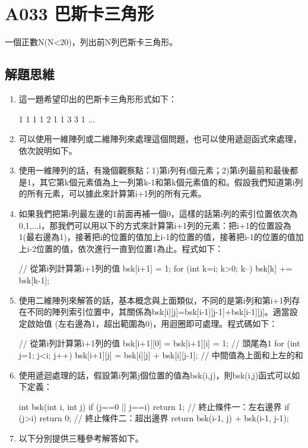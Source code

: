 \section{A033 巴斯卡三角形}
一個正數N(N<20)，列出前N列巴斯卡三角形。

\subsection{解題思維}

\begin{enumerate}
	\item 這一題希望印出的巴斯卡三角形形式如下：
	\begin{inside}
	1
	1 1
	1 2 1
	1 3 3 1
	...
	\end{inside}
	\item 可以使用一維陣列或二維陣列來處理這個問題，也可以使用遞迴函式來處理，依次說明如下。
	\item 使用一維陣列的話，有幾個觀察點：1)第i列有i個元素；2)第i列最前和最後都是1，其它第k個元素值為上一列第k-1和第k個元素值的和。假設我們知道第i列的所有元素，可以據此來計算第i+1列的所有元素。
	\item 如果我們把第i列最左邊的1前面再補一個0，這樣的話第i列的索引位置依次為0,1,...i，那我們可以用以下的方式來計算第i+1列的元素：把i+1的位置設為1(最右邊為1)，接著把i的位置的值加上i-1的位置的值，接著把i-1的位置的值加上i-2位置的值，依次進行一直到位置1為止。程式如下：
	\begin{inside}
		// 從第i列計算第i+1列的值
		bsk[i+1] = 1;
		for (int k=i; k>0; k--) bsk[k] += bsk[k-1];
	\end{inside}
	\item 使用二維陣列來解答的話，基本概念與上面類似，不同的是第i列和第i+1列存在不同的陣列索引位置中，其關係為bsk[i][j]=bsk[i-1][j-1]+bsk[i-1][j]。適當設定啟始值 (左右邊為1，超出範圍為0)，用迴圈即可處理。程式碼如下：
	\begin{inside}
		// 從第i列計算第i+1列的值
		bsk[i+1][0] = bsk[i+1][i] = 1; // 頭尾為1
		for (int j=1; j<i; j++) {
			bsk[i+1][j] = bsk[i][j] + bsk[i][j-1]; // 中間值為上面和上左的和
		}
	\end{inside}
	\item 使用遞迴處理的話，假設第i列第j個位置的值為bsk(i,j)，則bsk(i,j)函式可以如下定義：
	\begin{inside}
		int bsk(int i, int j)
		{
			if (j==0 || j==i) return 1; // 終止條件一：左右邊界
			if (j>i) return 0; // 終止條件二：超出邊界
			return bsk(i-1, j) + bsk(i-1, j-1);
		}
	\end{inside}
	\item 以下分別提供三種參考解答如下。
\end{enumerate} 

